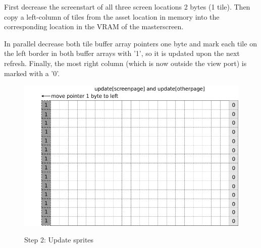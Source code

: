 \documentclass[book.tex]{subfiles}
\begin{document}
\begin{minipage}{.4\textwidth}
First decrease the screenstart of all three screen locations 2 bytes (1 tile). Then copy a left-column of tiles from the asset location in memory into the corresponding location in the VRAM of the masterscreen.\\
\par
In parallel decrease both tile buffer array pointers one byte and mark each tile on the left border in both buffer arrays with '1', so it is updated upon the next refresh.
Finally, the most right column (which is now outside the view port) is marked with a '0'.
 \end{minipage}
\begin{minipage}{.6\textwidth}
\begin{figure}[H]
  \centering
 \includegraphics[width=.9\textwidth]{screenshots_300dpi/game/Scroll_KC4_6_1-scroll_update.png}
 \label{fig:kc4_6_update_array}  
\end{figure}
\end{minipage}

\begin{figure}[H]
\centering
 \caption{Step 2: Update sprites}
 \label{fig:kc4_6_add_column}
\end{figure}
\end{document}
